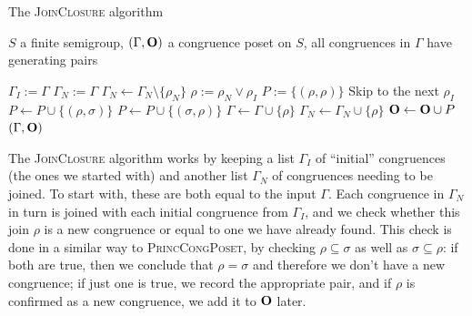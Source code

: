 \begin{algorithm}
  \caption{The \textsc{JoinClosure} algorithm}
  \label{alg:join-closure}
  \begin{algorithmic}[1]
    \Require
    $S$ a finite semigroup,
    $(\Gamma,\mathbf{O})$ a congruence poset on $S$,
    all congruences in $\Gamma$ have generating pairs
    
      \State $\Gamma_I := \Gamma$ 
      \State $\Gamma_N := \Gamma$ 
          \State $\Gamma_N \gets \Gamma_N \setminus \{\rho_N\}$
            \State $\rho := \rho_N \vee \rho_I$
            \State $P := \{(\rho, \rho)\}$
            \For{$\sigma \in \Gamma$}
              \If{$\rho \subseteq \sigma$}
                \If{$\sigma \subseteq \rho$}
                  \State Skip to the next $\rho_I$
                  \Comment{$\rho = \sigma$}
                \Else
                  \State $P \gets P \cup \{(\rho, \sigma)\}$
                \EndIf
              \ElsIf{$\sigma \subseteq \rho$}
                \State $P \gets P \cup \{(\sigma, \rho)\}$
              \EndIf
            \EndFor
            \State $\Gamma \gets \Gamma \cup \{\rho\}$
            \State $\Gamma_N \gets \Gamma_N \cup \{\rho\}$
            \State $\mathbf{O} \gets \mathbf{O} \cup P$
          \EndFor
        \EndFor
      \EndWhile
      \State \Return $(\Gamma, \mathbf{O})$
    \EndProcedure
  \end{algorithmic}
\end{algorithm}

The \textsc{JoinClosure} algorithm works by keeping a list $\Gamma_I$ of
``initial'' congruences (the ones we started with) and another list $\Gamma_N$
of congruences needing to be joined.  To start with, these are both equal to the
input $\Gamma$.  Each congruence in $\Gamma_N$ in turn is joined with each
initial congruence from $\Gamma_I$, and we check whether this join $\rho$ is a
new congruence or equal to one we have already found.  This check is done in a
similar way to \textsc{PrincCongPoset}, by checking $\rho \subseteq \sigma$ as
well as $\sigma \subseteq \rho$: if both are true, then we conclude that
$\rho = \sigma$ and therefore we don't have a new congruence; if just one is
true, we record the appropriate pair, and if $\rho$ is confirmed as a new
congruence, we add it to $\mathbf{O}$ later.

